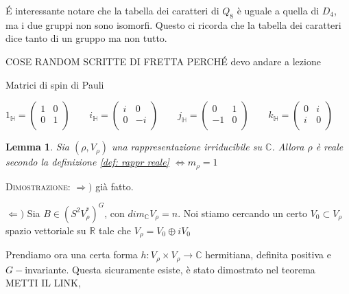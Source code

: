 \documentclass[11pt]{article}
\theoremstyle{plain}
\newtheorem{lemma}[thm]{Lemma}
\theoremstyle{definition}
\theoremstyle{remark}
\newcommand{\C}{\mathbb{C}}
\newcommand{\R}{\mathbb{R}}
\newcommand{\HH}{\mathbb{H}}
\begin{document}
\'E interessante notare che la tabella dei caratteri di $Q_8$ è uguale a quella di $D_4$, ma i due gruppi non sono isomorfi. Questo ci ricorda che la tabella dei caratteri dice tanto di un gruppo ma non tutto.


COSE RANDOM SCRITTE DI FRETTA PERCH\'E devo andare a lezione





Matrici di spin di Pauli


\[ 
1_\HH = 
\left(
\begin{array}{cc}
1 & 0 \\
0 & 1 \\
\end{array}
\right)
\qquad
i_\HH = 
\left(
\begin{array}{cc}
i & 0 \\
0 & -i \\
\end{array}
\right)
\qquad
j_\HH = 
\left(
\begin{array}{cc}
0 & 1 \\
-1 & 0 \\
\end{array}
\right)
\qquad
k_\HH =
\left(
\begin{array}{cc}
0 & i \\
i & 0 \\
\end{array}
\right)
\qquad
\]



\begin{lemma}
Sia $(\rho, V_\rho)$ una rappresentazione irriducibile su $\C$. Allora $\rho$ è reale secondo la definizione \ref{def: rappr reale} $\Leftrightarrow m_\rho = 1$ 
\end{lemma}

\textsc{Dimostrazione:} $\Rightarrow)$ già fatto.

$\Leftarrow)$ Sia $B \in (S^2V_\rho^*)^G$, con $dim_\C V_\rho = n$. Noi stiamo cercando un certo $V_0 \subset V_\rho$ spazio vettoriale su $\R$ tale che $V_\rho = V_0 \oplus i V_0$ 

Prendiamo ora una certa forma $h : V_\rho \times V_\rho \to \C$ hermitiana, definita positiva e $G-$invariante. Questa sicuramente esiste, è stato dimostrato nel teorema METTI IL LINK,
\end{document}
